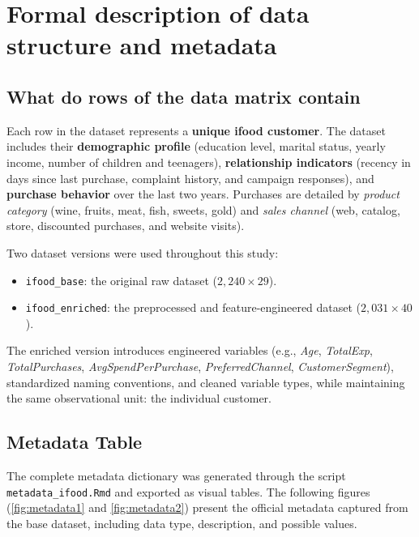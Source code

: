 \newpage
\section{Formal description of data structure and metadata}
\label{sec:metadata}

\subsection{What do rows of the data matrix contain}

Each row in the dataset represents a \textbf{unique ifood customer}. The dataset includes
their \textbf{demographic profile} (education level, marital status, yearly income,
number of children and teenagers), \textbf{relationship indicators} (recency in days
since last purchase, complaint history, and campaign responses), and \textbf{purchase
behavior} over the last two years. Purchases are detailed by \textit{product category}
(wine, fruits, meat, fish, sweets, gold) and \textit{sales channel} (web, catalog,
store, discounted purchases, and website visits).

Two dataset versions were used throughout this study:
\begin{itemize}
    \item \texttt{ifood\_base}: the original raw dataset (\(2{,}240 \times 29\)).
    \item \texttt{ifood\_enriched}: the preprocessed and feature-engineered dataset (\(2{,}031 \times 40\)).
\end{itemize}

The enriched version introduces engineered variables (e.g., \textit{Age}, \textit{TotalExp},
\textit{TotalPurchases}, \textit{AvgSpendPerPurchase}, \textit{PreferredChannel},
\textit{CustomerSegment}), standardized naming conventions, and cleaned variable
types, while maintaining the same observational unit: the individual customer.

\vspace{0.5em}

\subsection{Metadata Table}

The complete metadata dictionary was generated through the script
\texttt{metadata\_ifood.Rmd} and exported as visual tables. The following figures
(\autoref{fig:metadata1} and \autoref{fig:metadata2}) present the official metadata
captured from the base dataset, including data type, description, and possible
values.

